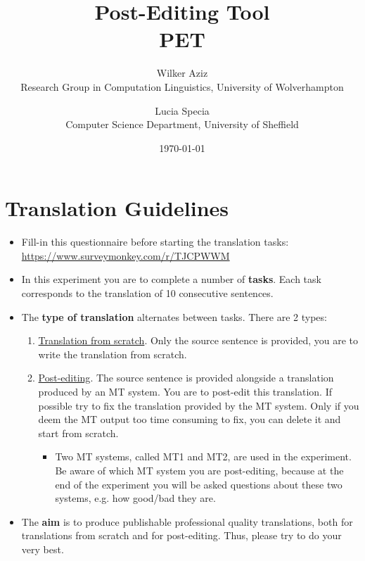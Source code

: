 \documentclass[pdftex,12pt,a4paper]{report} %
\title{Post-Editing Tool\\PET}
\date{\today}
\author{Wilker Aziz\\ Research Group in Computation Linguistics, University of Wolverhampton \and Lucia Specia \\ Computer Science Department, University of Sheffield}
\begin{document}




%





%

%

%

\chapter{Translation Guidelines}

\begin{itemize}

\item Fill-in this questionnaire before starting the translation tasks: \url{https://www.surveymonkey.com/r/TJCPWWM}

\item In this experiment you are to complete a number of \textbf{tasks}. Each task corresponds to the translation of 10 consecutive sentences.

\item The \textbf{type of translation} alternates between tasks. There are 2 types:
	\begin{enumerate}
	\item \underline{Translation from scratch}. Only the source sentence is provided, you are to write the translation from 	scratch.
	\item \underline{Post-editing}. The source sentence is provided alongside a translation produced by an MT system. You are to post-edit this translation. If possible try to fix the translation provided by the MT system. Only if you deem the MT output too time consuming to fix, you can delete it and start from scratch.
		\begin{itemize}
			\item Two MT systems, called MT1 and MT2, are used in the experiment. Be aware of which MT system you are post-editing, because at the end of the experiment you will be asked questions about these two systems, e.g. how good/bad they are.
		\end{itemize}
	\end{enumerate}
	
\item The \textbf{aim} is to produce publishable professional quality translations, both for translations from scratch and for post-editing. Thus, please try to do your very best.


\end{itemize}
\end{document}
